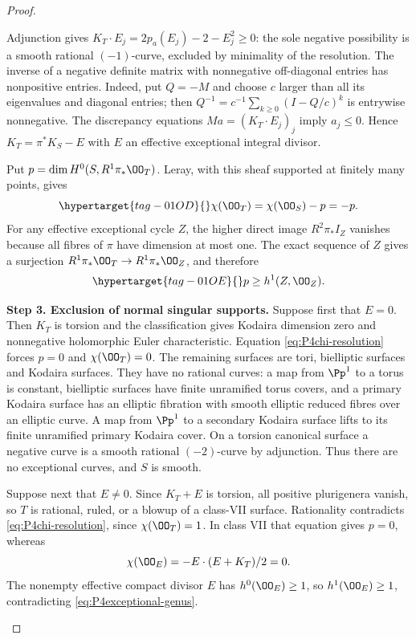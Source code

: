 \begin{proof}
\begin{enumerate}[label={$\langle1\rangle$\arabic*.},leftmargin=*]
Adjunction gives
$K_T\cdot E_j=2p_a(E_j)-2-E_j^2\ge0$: the sole negative
possibility is a smooth rational $(-1)$-curve, excluded by
minimality of the resolution. The inverse of a negative definite
matrix with nonnegative off-diagonal entries has nonpositive
entries. Indeed, put $Q=-M$ and choose $c$ larger than all its
eigenvalues and diagonal entries; then
$Q^{-1}=c^{-1}\sum_{k\ge0}(I-Q/c)^k$ is entrywise nonnegative.
The discrepancy equations $Ma=(K_T\cdot E_j)_j$ imply
$a_j\le0$. Hence $K_T=\pi^*K_S-E$ with $E$ an effective
exceptional integral divisor.

Put $p=\dim H^0(S,R^1\pi_*\OO_T)$. Leray, with this sheaf
supported at finitely many points, gives
\begin{equation}\hypertarget{tag-01OD}{}\label{eq:P4chi-resolution}
 \chi(\OO_T)=\chi(\OO_S)-p=-p.
\end{equation}
For any effective exceptional cycle $Z$, the higher direct image
$R^2\pi_*I_Z$ vanishes because all fibres of $\pi$ have dimension
at most one. The exact sequence of $Z$ gives a surjection
$R^1\pi_*\OO_T\to R^1\pi_*\OO_Z$, and therefore
\begin{equation}\hypertarget{tag-01OE}{}\label{eq:P4exceptional-genus}
 p\ge h^1(Z,\OO_Z).
\end{equation}

\noindent\textbf{Step 3. Exclusion of normal singular supports.}
Suppose first that $E=0$. Then $K_T$ is torsion and the
classification gives Kodaira dimension zero and nonnegative
holomorphic Euler characteristic. Equation
\eqref{eq:P4chi-resolution} forces $p=0$ and $\chi(\OO_T)=0$.
The remaining surfaces are tori, bielliptic surfaces and Kodaira
surfaces. They have no rational curves: a map from $\Pp^1$ to
a torus is constant, bielliptic surfaces have finite unramified
torus covers, and a primary Kodaira surface has an elliptic
fibration with smooth elliptic reduced fibres over an elliptic
curve. A map from $\Pp^1$ to a secondary Kodaira surface lifts
to its finite unramified primary Kodaira cover. On a torsion
canonical surface a negative curve is a smooth rational
$(-2)$-curve by adjunction. Thus there are no exceptional
curves, and $S$ is smooth.

Suppose next that $E\ne0$. Since $K_T+E$ is torsion, all
positive plurigenera vanish, so $T$ is rational, ruled, or a
blowup of a class-VII surface. Rationality contradicts
\eqref{eq:P4chi-resolution}, since $\chi(\OO_T)=1$. In class
VII that equation gives $p=0$, whereas
\[
 \chi(\OO_E)=-E\cdot(E+K_T)/2=0.
\]
The nonempty effective compact divisor $E$ has $h^0(\OO_E)\ge1$,
so $h^1(\OO_E)\ge1$, contradicting
\eqref{eq:P4exceptional-genus}.


\end{enumerate}
\end{proof}
